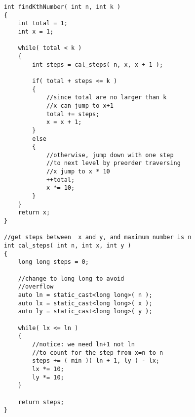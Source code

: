 \setcounter{lstlisting}{0}
\begin{lstlisting}[style=customc, caption={Prorder Traveseing With Jump To Tenary Tree}]
int findKthNumber( int n, int k )
{
    int total = 1;
    int x = 1;

    while( total < k )
    {
        int steps = cal_steps( n, x, x + 1 );

        if( total + steps <= k )
        {
            //since total are no larger than k
            //x can jump to x+1
            total += steps;
            x = x + 1;
        }
        else
        {
            //otherwise, jump down with one step
            //to next level by preorder traversing
            //x jump to x * 10
            ++total;
            x *= 10;
        }
    }
    return x;
}

//get steps between  x and y, and maximum number is n
int cal_steps( int n, int x, int y )
{
    long long steps = 0;

    //change to long long to avoid
    //overflow
    auto ln = static_cast<long long>( n );
    auto lx = static_cast<long long>( x );
    auto ly = static_cast<long long>( y );

    while( lx <= ln )
    {
        //notice: we need ln+1 not ln
        //to count for the step from x=n to n
        steps += ( min )( ln + 1, ly ) - lx;
        lx *= 10;
        ly *= 10;
    }

    return steps;
}
\end{lstlisting}